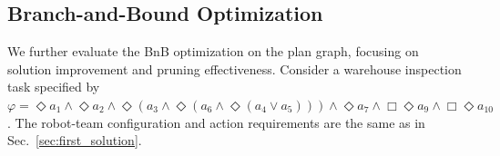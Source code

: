 \documentclass[lettersize,journal]{IEEEtran}
\theoremstyle{italiclemma}
\theoremstyle{italiclemma}
\theoremstyle{definition}
\begin{document}



\subsection{Branch-and-Bound Optimization} \label{bnb_exp}
We further evaluate the BnB optimization on the  plan graph, focusing on solution improvement and pruning effectiveness.
Consider a warehouse inspection task specified by $\varphi=\Diamond a_1\wedge\Diamond a_2\wedge \Diamond(a_3\wedge\Diamond(a_6\wedge\Diamond(a_4\vee a_5))) \wedge\Diamond a_7\wedge \Box\Diamond a_9\wedge \Box\Diamond a_{10}$. The robot-team configuration and action requirements are the same as in Sec.~\ref{sec:first_solution}.
\end{document}
